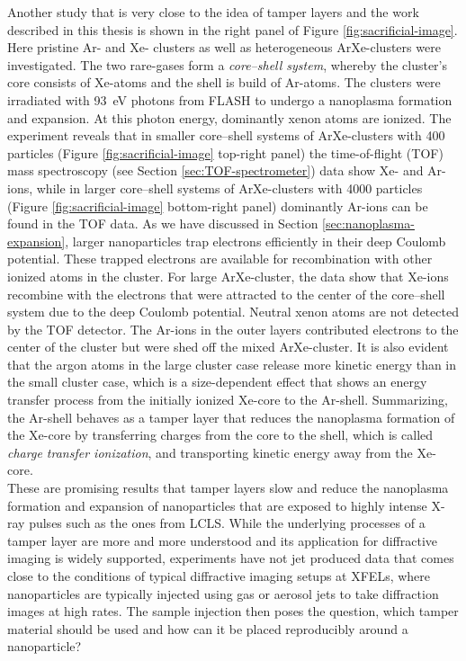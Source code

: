 Another study \citep{Hoener-2008-JPB} that is very close to the idea of tamper layers and the work described in this thesis is shown in the right panel of Figure \ref{fig:sacrificial-image}. Here pristine Ar- and Xe- clusters as well as heterogeneous ArXe-clusters were investigated. The two rare-gases form a \textit{core--shell system}, whereby the cluster's core consists of Xe-atoms and the shell is build of Ar-atoms. The clusters were irradiated with \SI{93}{\electronvolt} photons from FLASH to undergo a nanoplasma formation and expansion. At this photon energy, dominantly xenon atoms are ionized. The experiment reveals that in smaller core--shell systems of ArXe-clusters with \num{400} particles (Figure \ref{fig:sacrificial-image} top-right panel) the time-of-flight (TOF) mass spectroscopy (see Section \ref{sec:TOF-spectrometer}) data show Xe- and Ar-ions, while in larger core--shell systems of ArXe-clusters with \num{4000} particles (Figure \ref{fig:sacrificial-image} bottom-right panel) dominantly Ar-ions can be found in the TOF data. As we have discussed in Section \ref{sec:nanoplasma-expansion}, larger nanoparticles trap electrons efficiently in their deep Coulomb potential. These trapped electrons are available for recombination \cite{Hoener-2008-JPB,Fennel-2010-RMP} with other ionized atoms in the cluster. For large ArXe-cluster, the data show that Xe-ions recombine with the electrons that were attracted to the center of the core--shell system due to the deep Coulomb potential. Neutral xenon atoms are not detected by the TOF detector. The Ar-ions in the outer layers contributed electrons to the center of the cluster but were shed off the mixed ArXe-cluster. It is also evident that the argon atoms in the large cluster case release more kinetic energy than in the small cluster case, which is a size-dependent effect that shows an energy transfer process from the initially ionized Xe-core to the Ar-shell. Summarizing, the Ar-shell behaves as a tamper layer that reduces the nanoplasma formation of the Xe-core by transferring charges from the core to the shell, which is called \textit{charge transfer ionization}, and transporting kinetic energy away from the Xe-core.\\[1\baselineskip]
%
These are promising results that tamper layers slow and reduce the nanoplasma formation and expansion of nanoparticles that are exposed to highly intense X-ray pulses such as the ones from LCLS. While the underlying processes of a tamper layer are more and more understood and its application for diffractive imaging is widely supported, experiments have not jet produced data that comes close to the conditions of typical diffractive imaging setups at XFELs, where nanoparticles are typically injected using gas or aerosol jets to take diffraction images at high rates. The sample injection then poses the question, which tamper material should be used and how can it be placed reproducibly around a nanoparticle?
